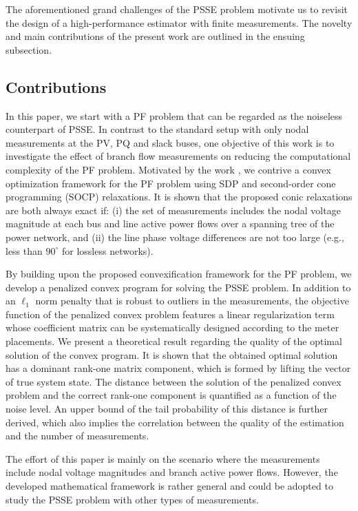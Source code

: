\documentclass[journal,twoside]{IEEEtran}
\begin{document}
The aforementioned grand challenges of the PSSE problem motivate us to revisit the design of a high-performance estimator with finite measurements.
The novelty and main contributions of the present work are outlined in the ensuing subsection.




\subsection{Contributions}
In this paper, we start with a PF problem that can be regarded as the noiseless counterpart of PSSE.
In contrast to the standard setup with only nodal measurements at the PV, PQ and slack buses,
one objective of this work is to investigate the effect of branch flow measurements on reducing the computational complexity of  the PF problem.
Motivated by the work \cite{Madani15CDC},
we contrive a convex optimization framework for the PF problem using  SDP and second-order cone programming (SOCP) relaxations.
It is shown that  the proposed conic relaxations are both always exact if: (i) the set of measurements includes the nodal voltage magnitude at each bus and line active power flows over a spanning tree of the power network, and (ii) the line phase voltage differences are not too large (e.g., less than $90^{\circ}$ for lossless networks).

By building upon the proposed convexification framework for the PF problem, we develop a penalized convex program for solving the PSSE problem.
In addition to an $\ell_1$ norm penalty that is robust to outliers in the measurements,
the objective function of the penalized convex problem features a linear regularization term
whose coefficient matrix can be systematically designed according to the meter placements.
We present a theoretical result regarding the quality of the optimal solution of the convex program.
It is shown that the obtained optimal solution has a dominant rank-one matrix component,
which is formed by lifting the vector of true system state. The distance between the
solution of the penalized convex problem and the correct rank-one component is quantified as a function of the noise level.
An upper bound of the tail probability of this distance is further derived,
which also implies the correlation between the quality of the estimation and the number of measurements.

The effort of this paper is mainly on the scenario where the measurements include nodal voltage magnitudes and branch active power flows.
However, the developed mathematical framework is rather general and could be adopted to study the PSSE problem with other types of measurements.
\end{document}
